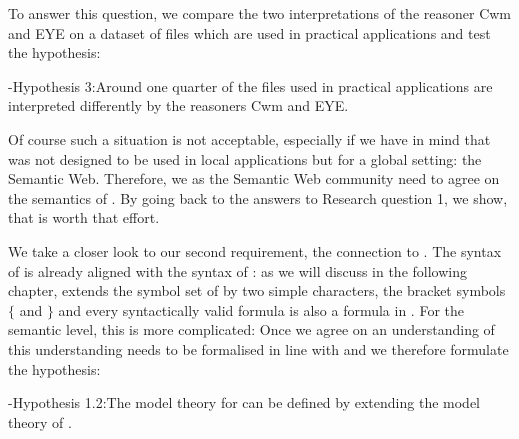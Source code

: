 To answer this question, we compare the two interpretations of the reasoner Cwm and EYE on a dataset of \nthree files which are used in practical applications and 
test the hypothesis:

\hyp{Hypothesis 3:}{Around one quarter of the files used in practical applications are interpreted differently by the reasoners Cwm and EYE.}  

Of course such a situation is not acceptable, especially if we have in mind that \nthreelogic was not designed to be used in local applications but 
for a global setting: the Semantic Web. Therefore, we as the Semantic Web community need to agree on the semantics of \nthreelogic.  By going back to the answers to 
Research question 1, we show, that \nthreelogic is worth that effort.  


We take a closer look to our second requirement, the connection to \rdf. The syntax of \nthree is already aligned with the syntax of \rdf: 
as we will discuss in the following chapter, \nthree extends the symbol set of \rdf by two simple characters,
the bracket symbols $\{$ and $\}$ and every syntactically valid \rdf formula is also a formula in \nthree.  For the semantic level, this is more complicated: 
Once we agree on an understanding of \nthreelogic this understanding needs to be formalised in line with \rdf and we therefore formulate the hypothesis:

\hyp{Hypothesis 1.2:}{The model theory for \nthree can be defined by extending the model theory of \rdf.}

